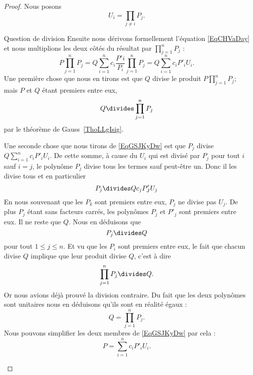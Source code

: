 \begin{proof}
    Nous posons
    \begin{equation}
        U_i=\prod_{j\neq i}P_j.
    \end{equation}
    \begin{subproof}
    \item[Question de division]
    Ensuite nous dérivons formellement l'équation \eqref{EqCHVaDay} et nous multiplions les deux côtés du résultat par \( \prod_{j=1}^nP_j\) :
    \begin{equation}        \label{EqGSJKyDw}
        P\prod_{j=1}^nP_j=Q\sum_{i=1}^nc_i\frac{ P'i }{ P_i }\prod_{j=1}^nP_j=Q\sum_{i=1}^nc_iP'_iU_i.
    \end{equation}
    Une première chose que nous en tirons est que \( Q\) divise le produit \( P\prod_{j=1}^nP_j\); mais \( P\) et \( Q\) étant premiers entre eux,
    \begin{equation}
        Q\divides \prod_{j=1}^nP_j
    \end{equation}
    par le théorème de Gauss~\ref{ThoLLgIsig}.

    Une seconde chose que nous tirons de \eqref{EqGSJKyDw} est que \( P_j\) divise \( Q\sum_{i=1}^nc_iP'_iU_i\). De cette somme, à cause du \( U_i\) qui est divisé par \( P_j\) pour tout \( i\) sauf \( i=j\), le polynôme \( P_j\) divise tous les termes sauf peut-être un. Donc il les divise tous et en particulier
    \begin{equation}
        P_j\divides Qc_jP'_JU_j
    \end{equation}
    En nous souvenant que les \( P_k\) sont premiers entre eux, \( P_j\) ne divise pas \( U_j\). De plus \( P_j\) étant sans facteurs carrés, les polynômes \( P_j\) et \( P'_j\) sont premiers entre eux. Il ne reste que \( Q\). Nous en déduisons que
    \begin{equation}
        P_j\divides Q
    \end{equation}
    pour tout \( 1\leq j\leq n\). Et vu que les \( P_i\) sont premiers entre eux, le fait que chacun divise \( Q\) implique que leur produit divise \( Q\), c'est à dire
    \begin{equation}
        \prod_{j=1}^nP_j\divides Q.
    \end{equation}
    Or nous avions déjà prouvé la division contraire. Du fait que les deux polynômes sont unitaires nous en déduisons qu'ils sont en réalité égaux :
    \begin{equation}        \label{EqJImORVe}
        Q=\prod_{j=1}^nP_j.
    \end{equation}
    Nous pouvons simplifier les deux membres de \eqref{EqGSJKyDw} par cela :
    \begin{equation}        \label{EqJMtGhGR}
        P=\sum_{i=1}^nc_iP'_iU_i.
    \end{equation}


\end{subproof}
\end{proof}
